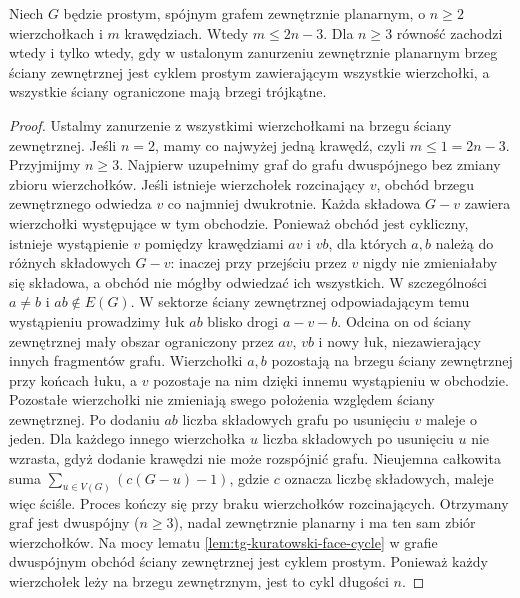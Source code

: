 \begin{twierdzenie}
Niech $G$ będzie prostym, spójnym grafem zewnętrznie planarnym,
o $n\ge2$ wierzchołkach i $m$ krawędziach. Wtedy
$m\le2n-3$. Dla $n\ge3$ równość zachodzi wtedy i tylko
wtedy, gdy w ustalonym zanurzeniu zewnętrznie planarnym
brzeg ściany zewnętrznej jest cyklem prostym
zawierającym wszystkie wierzchołki, a wszystkie
ściany ograniczone mają brzegi trójkątne.
\end{twierdzenie}

\begin{proof}
Ustalmy zanurzenie z wszystkimi wierzchołkami na brzegu
ściany zewnętrznej. Jeśli $n=2$, mamy co najwyżej jedną
krawędź, czyli $m\le1=2n-3$. Przyjmijmy $n\ge3$.
Najpierw uzupełnimy graf do grafu dwuspójnego bez zmiany
zbioru wierzchołków. Jeśli istnieje wierzchołek rozcinający
$v$, obchód brzegu zewnętrznego odwiedza $v$ co najmniej
dwukrotnie. Każda składowa $G-v$ zawiera wierzchołki występujące
w tym obchodzie. Ponieważ obchód jest cykliczny,
istnieje wystąpienie $v$ pomiędzy krawędziami $av$ i $vb$,
dla których $a,b$ należą do różnych składowych $G-v$:
inaczej przy przejściu przez $v$ nigdy nie zmieniałaby
się składowa, a obchód nie mógłby odwiedzać ich wszystkich.
W szczególności $a\ne b$ i $ab\notin E(G)$.
W sektorze ściany zewnętrznej odpowiadającym temu
wystąpieniu prowadzimy łuk $ab$ blisko drogi $a-v-b$.
Odcina on od ściany zewnętrznej mały obszar ograniczony
przez $av$, $vb$ i nowy łuk, niezawierający innych
fragmentów grafu. Wierzchołki $a,b$ pozostają na brzegu
ściany zewnętrznej przy końcach łuku, a $v$ pozostaje
na nim dzięki innemu wystąpieniu w obchodzie.
Pozostałe wierzchołki nie zmieniają swego położenia
względem ściany zewnętrznej.
Po dodaniu $ab$ liczba składowych grafu po usunięciu $v$
maleje o jeden. Dla każdego innego wierzchołka $u$
liczba składowych po usunięciu $u$ nie wzrasta, gdyż
dodanie krawędzi nie może rozspójnić grafu.
Nieujemna całkowita suma
$\sum_{u\in V(G)}(c(G-u)-1)$, gdzie $c$ oznacza
liczbę składowych, maleje więc ściśle. Proces kończy
się przy braku wierzchołków rozcinających. Otrzymany
graf jest dwuspójny ($n\ge3$), nadal zewnętrznie
planarny i ma ten sam zbiór wierzchołków.
Na mocy lematu \ref{lem:tg-kuratowski-face-cycle}
w grafie dwuspójnym obchód ściany zewnętrznej jest
cyklem prostym. Ponieważ każdy wierzchołek leży na brzegu
zewnętrznym, jest to cykl długości $n$.


\end{proof}
